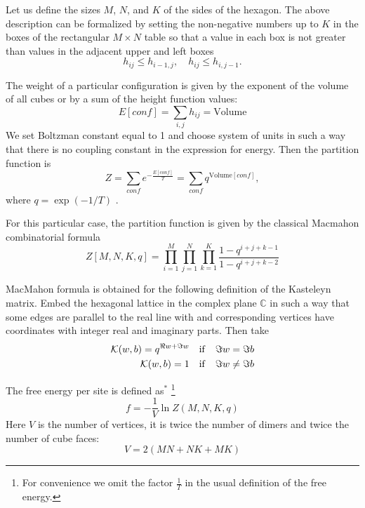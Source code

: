 \documentclass{article}
\begin{document}
Let us define the sizes $M$, $N$, and $K$ of the sides of the hexagon.
The above description can be formalized by
setting the non-negative numbers up to $K$ in the boxes of the rectangular $M\times N$ table so that a value in
each box is not greater than values in the adjacent upper and left boxes
\begin{equation}
  \label{eq:1}
  h_{ij}\leq h_{i-1,j},\quad h_{ij}\leq h_{i,j-1}.
\end{equation}

The weight of a particular configuration is given by the exponent of the volume of all cubes or by a
sum of the height function values:
\begin{equation*}
  \label{eq:10}
  E[conf]=\sum_{i,j} h_{ij}=\mathrm{Volume}
\end{equation*}
We set Boltzman constant equal to 1 and choose system of units in such a way that there is no
coupling constant in the expression for energy. Then the partition function is
\begin{equation*}
  \label{eq:14}
  Z=\sum_{conf} e^{-\frac{E[conf]}{T}}=\sum_{conf}q^{\mathrm{Volume}[conf]}, 
\end{equation*}
where $q=\exp\left(-1/T\right)$ .

For this particular case, the partition function is given by the classical Macmahon combinatorial
formula~\cite{vuletic2009generalization}
\begin{equation}
  \label{eq:12}
   Z[M,N,K,q]=\prod_{i=1}^{M}\prod_{j=1}^{N}\prod_{k=1}^{K}\frac{1-q^{i+j+k-1}}{1-q^{i+j+k-2}}
\end{equation}


MacMahon formula is obtained for the following definition of the Kasteleyn matrix. Embed the
hexagonal lattice in the complex plane $\mathbb{C}$ in such a way that some edges are parallel to
the real line with and corresponding vertices have coordinates with integer real and imaginary
parts. Then take
\begin{eqnarray}
  \label{eq:18}
  {\cal K}(w,b)=q^{\Re w+\Im w} \quad \mathrm{if}\quad \Im w=\Im b\\
  {\cal K}(w,b)=1 \quad \mathrm{if}\quad \Im w\neq\Im b
\end{eqnarray}


The   free energy per site is defined as$^{*}$
\footnote{For convenience we omit the factor $\frac{1}{T}$ in the usual definition of the free energy.}
\begin{equation*}
  \label{eq:17}
  f=-\frac{1}{V}\ln Z(M,N,K,q)
\end{equation*}
Here $V$ is the number of vertices, it is twice the number of dimers and twice the number of  cube faces:
\begin{equation*}
  \label{eq:19}
  V=2(MN+NK+MK)
\end{equation*}
\end{document}
